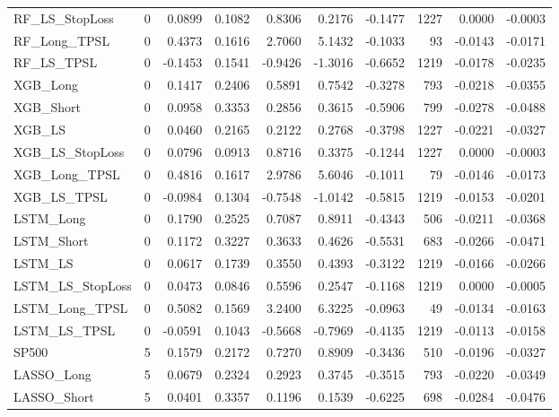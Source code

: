 \begin{tabular}{llrrrrrrrr}
\cline{1-10}
RF\_LS\_StopLoss & 0 & 0.0899 & 0.1082 & 0.8306 & 0.2176 & -0.1477 & 1227 & 0.0000 & -0.0003 \\
\cline{1-10}
RF\_Long\_TPSL & 0 & 0.4373 & 0.1616 & 2.7060 & 5.1432 & -0.1033 & 93 & -0.0143 & -0.0171 \\
\cline{1-10}
RF\_LS\_TPSL & 0 & -0.1453 & 0.1541 & -0.9426 & -1.3016 & -0.6652 & 1219 & -0.0178 & -0.0235 \\
\cline{1-10}
XGB\_Long & 0 & 0.1417 & 0.2406 & 0.5891 & 0.7542 & -0.3278 & 793 & -0.0218 & -0.0355 \\
\cline{1-10}
XGB\_Short & 0 & 0.0958 & 0.3353 & 0.2856 & 0.3615 & -0.5906 & 799 & -0.0278 & -0.0488 \\
\cline{1-10}
XGB\_LS & 0 & 0.0460 & 0.2165 & 0.2122 & 0.2768 & -0.3798 & 1227 & -0.0221 & -0.0327 \\
\cline{1-10}
XGB\_LS\_StopLoss & 0 & 0.0796 & 0.0913 & 0.8716 & 0.3375 & -0.1244 & 1227 & 0.0000 & -0.0003 \\
\cline{1-10}
XGB\_Long\_TPSL & 0 & 0.4816 & 0.1617 & 2.9786 & 5.6046 & -0.1011 & 79 & -0.0146 & -0.0173 \\
\cline{1-10}
XGB\_LS\_TPSL & 0 & -0.0984 & 0.1304 & -0.7548 & -1.0142 & -0.5815 & 1219 & -0.0153 & -0.0201 \\
\cline{1-10}
LSTM\_Long & 0 & 0.1790 & 0.2525 & 0.7087 & 0.8911 & -0.4343 & 506 & -0.0211 & -0.0368 \\
\cline{1-10}
LSTM\_Short & 0 & 0.1172 & 0.3227 & 0.3633 & 0.4626 & -0.5531 & 683 & -0.0266 & -0.0471 \\
\cline{1-10}
LSTM\_LS & 0 & 0.0617 & 0.1739 & 0.3550 & 0.4393 & -0.3122 & 1219 & -0.0166 & -0.0266 \\
\cline{1-10}
LSTM\_LS\_StopLoss & 0 & 0.0473 & 0.0846 & 0.5596 & 0.2547 & -0.1168 & 1219 & 0.0000 & -0.0005 \\
\cline{1-10}
LSTM\_Long\_TPSL & 0 & 0.5082 & 0.1569 & 3.2400 & 6.3225 & -0.0963 & 49 & -0.0134 & -0.0163 \\
\cline{1-10}
LSTM\_LS\_TPSL & 0 & -0.0591 & 0.1043 & -0.5668 & -0.7969 & -0.4135 & 1219 & -0.0113 & -0.0158 \\
\cline{1-10}
SP500 & 5 & 0.1579 & 0.2172 & 0.7270 & 0.8909 & -0.3436 & 510 & -0.0196 & -0.0327 \\
\cline{1-10}
LASSO\_Long & 5 & 0.0679 & 0.2324 & 0.2923 & 0.3745 & -0.3515 & 793 & -0.0220 & -0.0349 \\
\cline{1-10}
LASSO\_Short & 5 & 0.0401 & 0.3357 & 0.1196 & 0.1539 & -0.6225 & 698 & -0.0284 & -0.0476 \\

\end{tabular}
